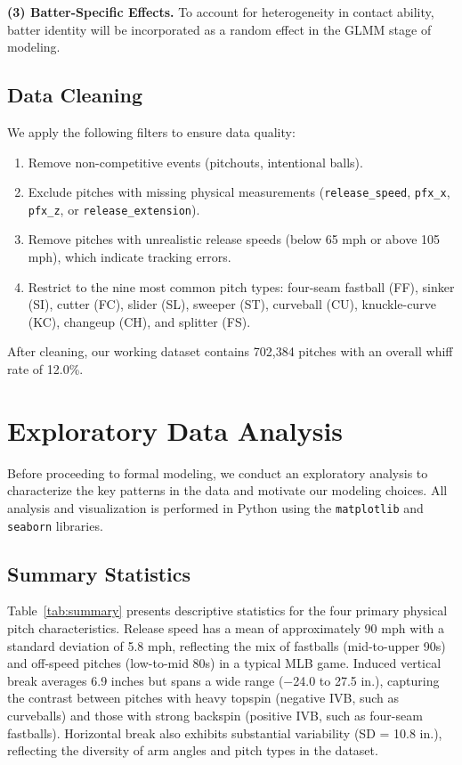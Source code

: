 \documentclass[11pt]{article}
\newcommand{\totalPitches}{702{,}384}    %
\newcommand{\overallWhiff}{12.0}         %
\begin{document}
\medskip
\noindent\textbf{(3) Batter-Specific Effects.}
To account for heterogeneity in contact ability, batter identity will be incorporated as a random effect in the GLMM stage of modeling.

\subsection{Data Cleaning}

We apply the following filters to ensure data quality:
\begin{enumerate}[nosep]
    \item Remove non-competitive events (pitchouts, intentional balls).
    \item Exclude pitches with missing physical measurements (\texttt{release\_speed}, \texttt{pfx\_x}, \texttt{pfx\_z}, or \texttt{release\_extension}).
    \item Remove pitches with unrealistic release speeds (below 65 mph or above 105 mph), which indicate tracking errors.
    \item Restrict to the nine most common pitch types: four-seam fastball (FF), sinker (SI), cutter (FC), slider (SL), sweeper (ST), curveball (CU), knuckle-curve (KC), changeup (CH), and splitter (FS).
\end{enumerate}
After cleaning, our working dataset contains \totalPitches{} pitches with an overall whiff rate of \overallWhiff\%.

\section{Exploratory Data Analysis}

Before proceeding to formal modeling, we conduct an exploratory analysis to characterize the key patterns in the data and motivate our modeling choices.
All analysis and visualization is performed in Python using the \texttt{matplotlib} \citep{matplotlib2007} and \texttt{seaborn} \citep{seaborn2021} libraries.

\subsection{Summary Statistics}

Table~\ref{tab:summary} presents descriptive statistics for the four primary physical pitch characteristics.
Release speed has a mean of approximately 90 mph with a standard deviation of 5.8 mph, reflecting the mix of fastballs (mid-to-upper 90s) and off-speed pitches (low-to-mid 80s) in a typical MLB game.
Induced vertical break averages 6.9 inches but spans a wide range ($-$24.0 to 27.5 in.), capturing the contrast between pitches with heavy topspin (negative IVB, such as curveballs) and those with strong backspin (positive IVB, such as four-seam fastballs).
Horizontal break also exhibits substantial variability (SD = 10.8 in.), reflecting the diversity of arm angles and pitch types in the dataset.
\end{document}
